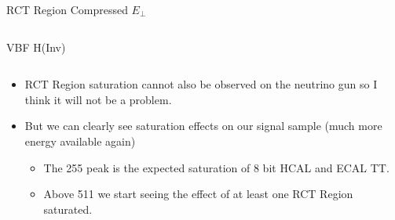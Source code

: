 \documentclass[8pt]{beamer}
\begin{document}
\begin{frame}{RCT Region Compressed $E_{\perp}$}
\begin{columns}
\begin{block}{VBF H(Inv)}
\end{block}

\end{columns}

\begin{tiny}

\begin{itemize}
  \item RCT Region saturation cannot also be observed on the neutrino gun so I think it will not be a problem.
  \item But we can clearly see saturation effects on our signal sample (much more energy available again) 
  \begin{itemize}
    \tiny
    \item The 255 peak is the expected saturation of 8 bit HCAL and ECAL TT.
    \item Above 511 we start seeing the effect of at least one RCT Region saturated. 
  \end{itemize}
\end{itemize}

\end{tiny}

\end{frame}
\end{document}
